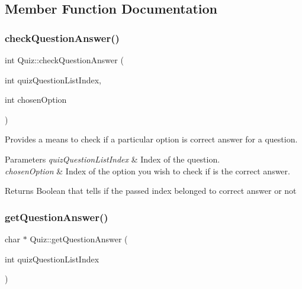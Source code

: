 \subsection{Member Function Documentation}
\mbox{\label{class_quiz_a8be2b23747e3467eafcadd9503f82798}} 
\subsubsection{\texorpdfstring{checkQuestionAnswer()}{checkQuestionAnswer()}}
{\footnotesize\ttfamily int Quiz\+::check\+Question\+Answer (\begin{DoxyParamCaption}\item[{int}]{quiz\+Question\+List\+Index,  }\item[{int}]{chosen\+Option }\end{DoxyParamCaption})}



Provides a means to check if a particular option is correct answer for a question. 


\begin{DoxyParams}{Parameters}
{\em quiz\+Question\+List\+Index} & Index of the question. \\
\hline
{\em chosen\+Option} & Index of the option you wish to check if is the correct answer.\\
\hline
\end{DoxyParams}
\begin{DoxyReturn}{Returns}
Boolean that tells if the passed index belonged to correct answer or not 
\end{DoxyReturn}
\mbox{\label{class_quiz_a9889abe5ef272cb557d1b0ada490b070}} 
\subsubsection{\texorpdfstring{getQuestionAnswer()}{getQuestionAnswer()}}
{\footnotesize\ttfamily char $\ast$ Quiz\+::get\+Question\+Answer (\begin{DoxyParamCaption}\item[{int}]{quiz\+Question\+List\+Index }\end{DoxyParamCaption})}



